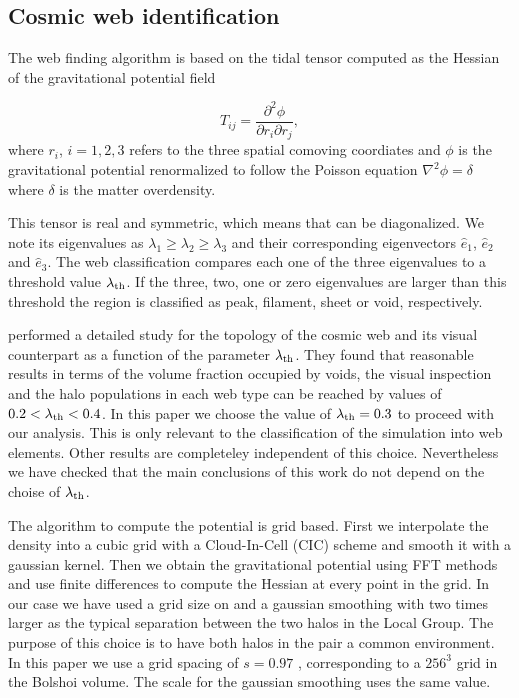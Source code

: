 \documentclass{emulateapj}
\newcommand{\manuscript}{paper }
\newcommand{\hMpc}{{\ifmmode{h^{-1}{\rm Mpc}}\else{$h^{-1}$Mpc }\fi}}
\begin{document}
\subsection{Cosmic web identification}
The web finding algorithm is based on the tidal tensor computed as the
Hessian of the  gravitational potential field

\begin{equation}
T_{ij} = \frac{\partial^2 \phi}{\partial r_i \partial r_j}, 
\end{equation}
%
where $r_{i}$, $i=1,2,3$ refers to the three spatial comoving
coordiates and $\phi$ is the gravitational potential renormalized to
follow the Poisson equation $\nabla^2\phi=\delta$ where
$\delta$ is the matter overdensity.  

This tensor is real and symmetric, which means that can be
diagonalized. 
We note its eigenvalues as $\lambda_1\geq \lambda_2\geq
\lambda_3$ and their corresponding eigenvectors $\hat{e}_1$,
$\hat{e}_2$ and $\hat{e}_3$. 
The web classification compares each one
of the three eigenvalues to a threshold value $\lambda_{\rm th}$. 
If
the three, two, one or zero eigenvalues are larger than this threshold
the region is classified as peak, filament, sheet or void,
respectively.  

\cite{Tweb} performed a detailed study for the topology of the
cosmic web and its visual counterpart as a function of the parameter
$\lambda_{\rm th}$. 
They found that reasonable results in terms of the
volume fraction occupied by voids, the visual inspection and the halo
populations in each web type can be reached by values of $0.2<\lambda_{\rm
th}<0.4$. 
In this \manuscript we choose the value of $\lambda_{\rm
  th}=0.3$ to proceed with our analysis. 
This is only relevant to the classification of the simulation into web
elements. Other results are completeley independent of this
choice. Nevertheless we have checked that the main conclusions of this
work do not depend on the choise of $\lambda_{\rm th}$.


The algorithm to compute the potential is grid based. 
First we interpolate the density into a cubic grid with a
Cloud-In-Cell (CIC) scheme and smooth it with a gaussian kernel. 
Then we obtain the gravitational potential using FFT methods and use finite differences
to compute the Hessian at every point in the grid. 
In our case we have used a grid size on and a gaussian smoothing with
two times larger as the typical separation between the two halos in the Local Group. 
The purpose of this choice is to have both halos in the pair a common
environment. 
In this \manuscript we use a grid spacing of $s=0.97$ \hMpc,
corresponding to a $256^3$ grid in the Bolshoi volume. 
The scale for the gaussian smoothing uses the same value.
\end{document}
